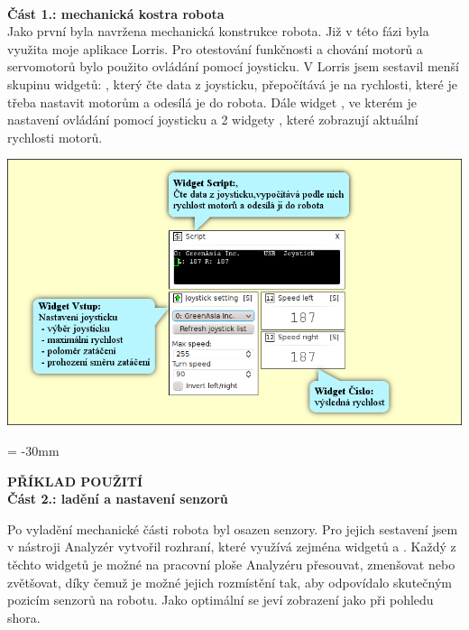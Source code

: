 \documentclass[17pt]{extreport}
\newcommand{\B}{\textbf} %
\begin{document}
\\{\large \B{Část 1.: mechanická kostra robota}}\\
Jako první byla navržena mechanická konstrukce robota. Již v této fázi byla využita moje aplikace Lorris. Pro otestování funkčnosti a chování motorů a servomotorů bylo použito ovládání pomocí joysticku. V Lorris jsem sestavil menší skupinu widgetů: , který čte data z joysticku, přepočítává je na rychlosti, které je třeba nastavit motorům a odesílá je do robota. Dále widget , ve kterém je nastavení ovládání pomocí joysticku a 2 widgety , které zobrazují aktuální rychlosti motorů.
\begin{center}
\includegraphics{img/joystick2.png}
\end{center}

\newpage
\enlargethispage{100mm} %
\voffset = -30mm %
\begin{center}
    \Large \B{PŘÍKLAD POUŽITÍ \\ Část 2.: ladění a nastavení senzorů}
\end{center}
\vspace{5mm}
Po vyladění mechanické části robota byl osazen senzory. Pro jejich sestavení jsem v nástroji Analyzér vytvořil rozhraní, které využívá zejména widgetů  a . Každý z těchto widgetů je možné na pracovní ploše Analyzéru přesouvat, zmenšovat nebo zvětšovat, díky čemuž je možné jejich rozmístění tak, aby odpovídalo skutečným pozicím senzorů na robotu. Jako optimální se jeví zobrazení jako při pohledu shora.
\end{document}
